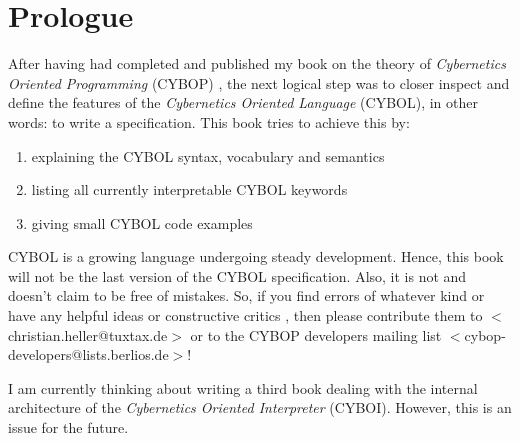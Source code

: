 %
%
%
%
%
%

\section*{Prologue}
\label{prologue_heading}

After having had completed and published my book on the theory of
\emph{Cybernetics Oriented Programming} (CYBOP) \cite{cybopbook}, the next
logical step was to closer inspect and define the features of the
\emph{Cybernetics Oriented Language} (CYBOL), in other words: to write a
specification. This book tries to achieve this by:

\begin{enumerate}
    \item explaining the CYBOL syntax, vocabulary and semantics
    \item listing all currently interpretable CYBOL keywords
    \item giving small CYBOL code examples
\end{enumerate}

CYBOL is a growing language undergoing steady development. Hence, this book
will not be the last version of the CYBOL specification. Also, it is not and
doesn't claim to be free of mistakes. So, if you find errors of whatever kind
or have any helpful ideas or constructive critics \cite{hackermanifesto}, then
please contribute them to \(<\)christian.heller@tuxtax.de\(>\) or to the CYBOP
developers mailing list \(<\)cybop-developers@lists.berlios.de\(>\)!

I am currently thinking about writing a third book dealing with the internal
architecture of the \emph{Cybernetics Oriented Interpreter} (CYBOI). However,
this is an issue for the future.

